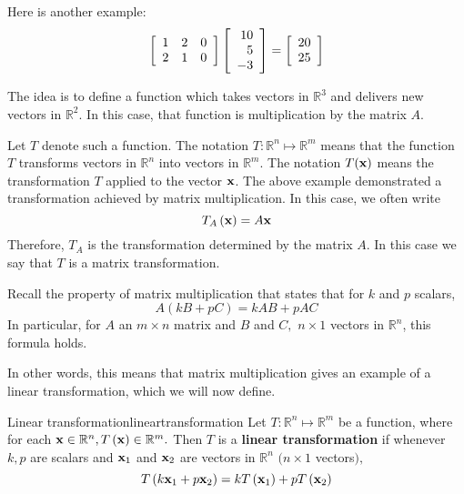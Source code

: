 \begin{solution}
Here is another example:
\begin{equation*}
\left[
\begin{array}{rrr}
1 & 2 & 0 \\
2 & 1 & 0
\end{array}
\right] \left[
\begin{array}{r}
10 \\
5 \\
-3
\end{array}
\right] =\allowbreak \left[
\begin{array}{r}
20 \\
25
\end{array}
\right]
\end{equation*}
\end{solution}

The idea is to define a function which takes vectors in
$\mathbb{R}^{3}$ and delivers new vectors in $\mathbb{R}^{2}.$ In this
case, that function is multiplication by the matrix $A$.

Let $T$ denote such a function. The notation $T:\mathbb{R}^{n}\mapsto \mathbb{R}^{m}$ means that the function $T$
transforms vectors in $\mathbb{R}^{n}$ into vectors in $\mathbb{R}^{m}$. The notation $T({\bf x})$ means the transformation $T$ applied to the vector ${\bf x}$. The above example demonstrated a transformation achieved by matrix multiplication. In this case,  we often write
\begin{equation*}
T_{A}\left( {\bf x}\right) =A {\bf x}
\end{equation*}
Therefore, $T_{A}$ is the transformation determined by the matrix $A$. In this case we say that $T$ is a matrix transformation. 

Recall the property of matrix multiplication that states that for 
$k $ and $p$ scalars,
\begin{equation*}
A\left( kB+pC\right) =kAB+pAC
\end{equation*}
In particular, for $A$ an $m\times n$ matrix and $B$ and $C,$ $n\times 1$
vectors in $\mathbb{R}^{n}$,  this formula holds.

In other words, this means that matrix multiplication gives an
example of a linear transformation, which we will now define. 

\begin{definition}{Linear transformation}{lineartransformation}
 Let $T:\mathbb{R}^{n}\mapsto \mathbb{R}^{m}$ be a function, where for each
${\bf x} \in \mathbb{R}^{n},T\left({\bf x}\right)\in \mathbb{R}^{m}.$ Then $T$ is a
\textbf{linear transformation} if whenever $k ,p $ are scalars and 
${\bf x}_1$ and ${\bf x}_2$ are vectors in $\mathbb{R}^{n}$ $(
n\times 1$ vectors$),$
\begin{equation*}
T\left( k {\bf x}_1 + p {\bf x}_2 \right) = kT\left({\bf x}_1\right)+ pT\left({\bf x}_{2} \right)
\end{equation*}
\end{definition}

